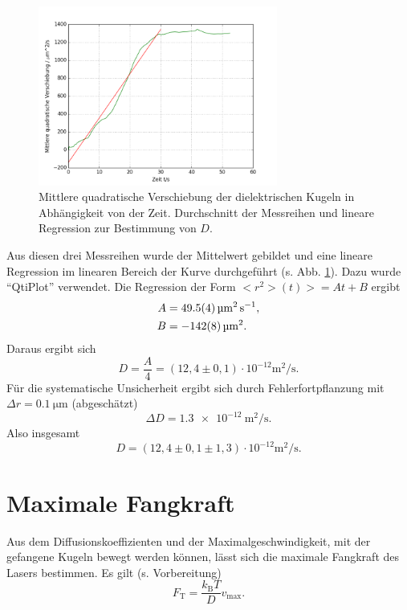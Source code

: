\begin{figure}[tb]
	\centering\includegraphics[width=0.7\textwidth]{fig/brown_summe.png}
	\caption{Mittlere quadratische Verschiebung der dielektrischen Kugeln in Abhängigkeit von der Zeit. Durchschnitt der Messreihen und lineare Regression zur Bestimmung von $D$.}
	\label{fig:brown_summe}
\end{figure}

Aus diesen drei Messreihen wurde der Mittelwert gebildet und eine lineare Regression im linearen Bereich der Kurve durchgeführt (s. Abb. \ref{fig:brown_summe}). Dazu wurde ``QtiPlot'' verwendet.
Die Regression der Form $<r^{2}>(t)>=At+B$ ergibt
\begin{align}
 A &= \SI{49,5\pm0,4}{\micro\meter\squared\per\second}, \\
 B &= \SI{-142\pm8}{\micro\meter\squared}.
\end{align}
Daraus ergibt sich
\begin{equation}
 D = \frac{A}{4} = (12,4\pm0,1)\cdot 10^{-12}\si{\meter\squared\per\second}.
\end{equation}
Für die systematische Unsicherheit ergibt sich durch Fehlerfortpflanzung mit $\Delta r=\SI{0,1}{\micro\metre}$ (abgeschätzt)
\begin{equation}
 \Delta D= \SI{1,3e-12}{\meter\squared\per\second}.
\end{equation}
Also insgesamt
\begin{equation}
 D = (12,4\pm0,1\pm1,3)\cdot 10^{-12}\si{\meter\squared\per\second}.
\end{equation}


\section{Maximale Fangkraft}

Aus dem Diffusionskoeffizienten und der Maximalgeschwindigkeit, mit der gefangene Kugeln bewegt werden können, lässt sich die maximale Fangkraft des Lasers bestimmen. Es gilt (s. Vorbereitung)
\begin{equation}
 F_{\textrm{T}} = \frac{k_{\textrm{B}}T}{D} v_{\textrm{max}}.
\end{equation}

